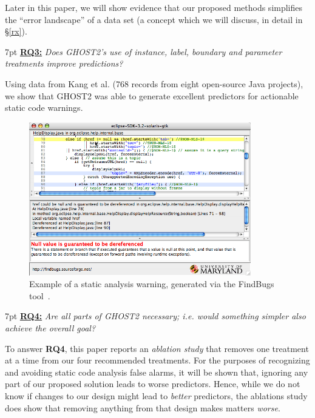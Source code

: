 \documentclass[compsoc,10pt]{IEEEtran}
\newenvironment{formal}{%
  \def\FrameCommand{%
    \hspace{1pt}%
    {\color{darkblue}\vrule width 2pt}%
    {\color{formalshade}\vrule width 4pt}%
    \colorbox{formalshade}%
  }%
  \MakeFramed{\advance\hsize-\width\FrameRestore}%
  \noindent\hspace{-1pt}%
  \begin{adjustwidth}{}{7pt}%
  \vspace{2pt}\vspace{2pt}%
}
{%
  \vspace{3pt}\end{adjustwidth}\endMakeFramed%
}
\newcommand{\rqn}[1]{\underline{\textbf{RQ#1:}}}
\begin{document}
Later in this paper, we will show evidence that our proposed methods
simplifies the ``error landscape'' of a data set (a concept which we will discuss, in detail in \S\ref{rx}).

 
\begin{formal}\noindent 
\rqn{3} {\em Does  GHOST2's  use of {\em instance}, {\em label}, {\em boundary}  and {\em parameter} treatments improve predictions?} 
\end{formal}
  
 Using data from Kang et al. (768 records from  eight open-source Java projects), we show that
 GHOST2  was able to generate excellent predictors for actionable static code warnings.




\begin{figure}[!t]
\begin{center}
\includegraphics[width=3.8in]{tim/guaranteedDereference.png}\end{center}
\caption{Example of a static analysis warning, generated via the FindBugs
tool~\cite{ayewah2010google}.}\label{fig:fb}
\end{figure}

 \begin{formal}\noindent   
\rqn{4} {\em Are all parts of GHOST2 necessary; i.e. would something
simpler also achieve the overall goal?}
\end{formal}

   
   To answer {\bf RQ4},   this paper   reports an 
{\em ablation study} that removes
one treatment at a time from our four recommended treatments. For the purposes of 
recognizing and avoiding
static code analysis false alarms, it will be shown that,
ignoring any part of our proposed solution   leads
to worse predictors.
Hence, while we do not know if  changes to our design might lead to {\em better}
predictors, the
ablations study does show that removing anything from that design makes matters {\em worse}.
 
\end{document}
